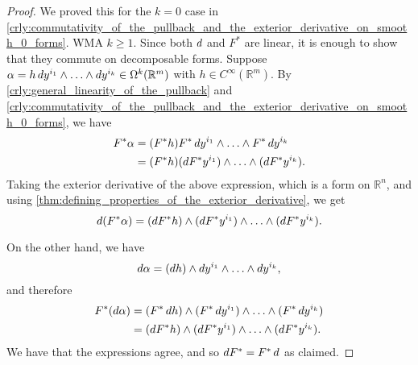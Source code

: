 \documentclass[notoc,notitlepage]{tufte-book}
\begin{document}
\begin{proof}
  We proved this for the $k = 0 $ case in
  \cref{crly:commutativity_of_the_pullback_and_the_exterior_derivative_on_smooth_0_forms}.
  WMA $k \geq 1$. Since both $\mathop{}\!d{}$ and $F^*$ are linear, it is enough to show that they
  commute on decomposable forms. Suppose $\alpha = h \mathop{}\!d{y^{i_1}} \land \hdots \land \mathop{}\!d{y^{i_k}} \in
  \Omega^k(\mathbb{R}^m)$ with $h \in C^{\infty}(\mathbb{R}^m)$. By
  \cref{crly:general_linearity_of_the_pullback} and
  \cref{crly:commutativity_of_the_pullback_and_the_exterior_derivative_on_smooth_0_forms},
  we have
  \begin{align*}
    F^* \alpha &= (F^* h) F^* \mathop{}\!d{y^{i_1}} \land \hdots \land F^* \mathop{}\!d{y^{i_k}} \\
               &= (F^* h) (\mathop{}\!d{F^* y^{i_1}}) \land \hdots \land (\mathop{}\!d{F^* y^{i_k}}).
  \end{align*}
  Taking the exterior derivative of the above expression, which is a form on
  $\mathbb{R}^n$, and using \cref{thm:defining_properties_of_the_exterior_derivative}, we
  get
  \begin{equation*}
    \mathop{}\!d{(F^* \alpha)} = (\mathop{}\!d{F^* h}) \land (\mathop{}\!d{F^* y^{i_1}}) \land \hdots \land
    (\mathop{}\!d{F^* y^{i_k}}).
  \end{equation*}

  On the other hand, we have
  \begin{equation*}
    \mathop{}\!d{\alpha} = (\mathop{}\!d{h}) \land \mathop{}\!d{y^{i_1}} \land \hdots \land \mathop{}\!d{y^{i_k}},
  \end{equation*}
  and therefore
  \begin{align*}
    F^* ( \mathop{}\!d{\alpha} ) &= (F^* \mathop{}\!d{h}) \land (F^* \mathop{}\!d{y^{i_1}}) \land \hdots \land
                          (F^* \mathop{}\!d{y^{i_k}}) \\
                         &= (\mathop{}\!d{F^* h}) \land (\mathop{}\!d{F^* y^{i_1}}) \land \hdots \land
                          (\mathop{}\!d{F^* y^{i_k}}).
  \end{align*}
  We have that the expressions agree, and so $\mathop{}\!d{F^*} = F^* \mathop{}\!d{}$ as claimed.
\end{proof}




\end{document}

